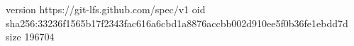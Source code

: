 version https://git-lfs.github.com/spec/v1
oid sha256:33236f1565b17f2343fac616a6cbd1a8876accbb002d910ee5f0b36fe1ebdd7d
size 196704
